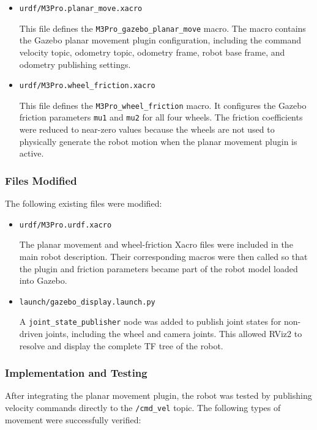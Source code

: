 \documentclass{article}
\begin{document}
\begin{itemize}
    \item \texttt{urdf/M3Pro.planar\_move.xacro}

    This file defines the \texttt{M3Pro\_gazebo\_planar\_move} macro. The macro contains the Gazebo planar movement plugin configuration, including the command velocity topic, odometry topic, odometry frame, robot base frame, and odometry publishing settings.

    \item \texttt{urdf/M3Pro.wheel\_friction.xacro}

    This file defines the \texttt{M3Pro\_wheel\_friction} macro. It configures the Gazebo friction parameters \texttt{mu1} and \texttt{mu2} for all four wheels. The friction coefficients were reduced to near-zero values because the wheels are not used to physically generate the robot motion when the planar movement plugin is active.
\end{itemize}

\subsubsection{Files Modified}

The following existing files were modified:

\begin{itemize}
    \item \texttt{urdf/M3Pro.urdf.xacro}

    The planar movement and wheel-friction Xacro files were included in the main robot description. Their corresponding macros were then called so that the plugin and friction parameters became part of the robot model loaded into Gazebo.

    \item \texttt{launch/gazebo\_display.launch.py}

    A \texttt{joint\_state\_publisher} node was added to publish joint states for non-driven joints, including the wheel and camera joints. This allowed RViz2 to resolve and display the complete TF tree of the robot.
\end{itemize}

\subsubsection{Implementation and Testing}

After integrating the planar movement plugin, the robot was tested by publishing velocity commands directly to the \texttt{/cmd\_vel} topic. The following types of movement were successfully verified:
\end{document}
